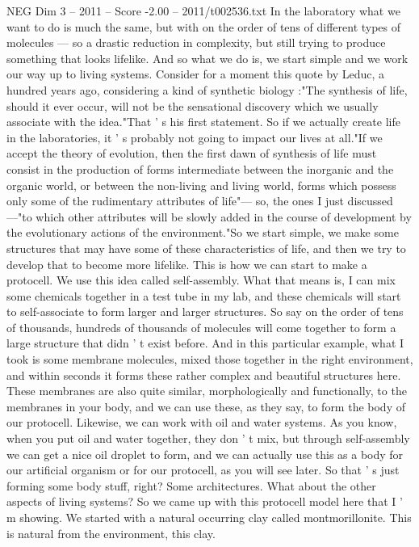 \begin{textsample}{NEG Dim 3 – 2011 – Score -2.00 – 2011/t002536.txt}
In the laboratory what we want to do is much the same, but with on the order of tens of different types of molecules — so a drastic reduction in complexity, but still trying to produce something that looks lifelike.
And so what we do is, we start simple and we work our way up to living systems.
Consider for a moment this quote by Leduc, a hundred years ago, considering a kind of synthetic biology :"The synthesis of life, should it ever occur, will not be the sensational discovery which we usually associate with the idea."That ' s his first statement.
So if we actually create life in the laboratories, it ' s probably not going to impact our lives at all."If we accept the theory of evolution, then the first dawn of synthesis of life must consist in the production of forms intermediate between the inorganic and the organic world, or between the non-living and living world, forms which possess only some of the rudimentary attributes of life"— so, the ones I just discussed —"to which other attributes will be slowly added in the course of development by the evolutionary actions of the environment."So we start simple, we make some structures that may have some of these characteristics of life, and then we try to develop that to become more lifelike.
This is how we can start to make a protocell.
We use this idea called self-assembly.
What that means is, I can mix some chemicals together in a test tube in my lab, and these chemicals will start to self-associate to form larger and larger structures.
So say on the order of tens of thousands, hundreds of thousands of molecules will come together to form a large structure that didn ' t exist before.
And in this particular example, what I took is some membrane molecules, mixed those together in the right environment, and within seconds it forms these rather complex and beautiful structures here.
These membranes are also quite similar, morphologically and functionally, to the membranes in your body, and we can use these, as they say, to form the body of our protocell.
Likewise, we can work with oil and water systems.
As you know, when you put oil and water together, they don ' t mix, but through self-assembly we can get a nice oil droplet to form, and we can actually use this as a body for our artificial organism or for our protocell, as you will see later.
So that ' s just forming some body stuff, right?
Some architectures.
What about the other aspects of living systems?
So we came up with this protocell model here that I ' m showing.
We started with a natural occurring clay called montmorillonite.
This is natural from the environment, this clay.

\end{textsample}
